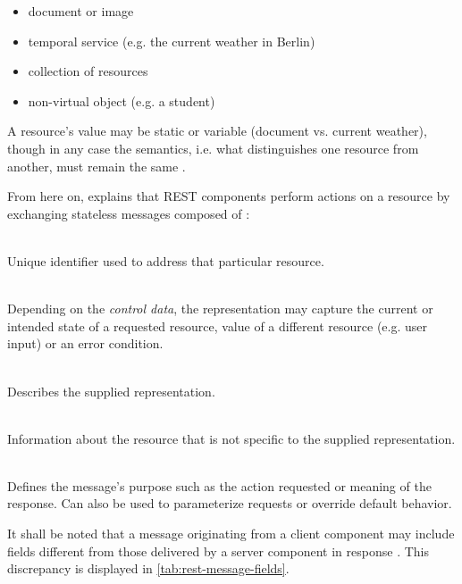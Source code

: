 \begin{appendices}
\begin{itemize}
  \item document or image
  \item temporal service (e.g. the current weather in Berlin)
  \item collection of resources
  \item non-virtual object (e.g. a student)
\end{itemize}

A resource's value may be static or variable (document vs. current weather), though in any case the semantics, i.e. what distinguishes one resource from another, must remain the same \cite[p.~89]{fielding2000architectural}.

From here on, \citeauthor{fielding2000architectural} explains that \ac{REST} components perform actions on a resource by exchanging stateless messages composed of \cite[pp.~90--91]{fielding2000architectural}:

\begin{description}[format={\storedescriptionlabel}]
	\item[Resource Identifier]
	\hfill \\
	Unique identifier used to address that particular resource.
	\item[Representation]
	\hfill \\
	Depending on the \textit{control data}, the representation may capture the current or intended state of a requested resource, value of a different resource (e.g. user input) or an error condition.
	\item[Representation Metadata]
	\hfill \\
	Describes the supplied representation.
	\item[Resource Metadata]
	\hfill \\
	Information about the resource that is not specific to the supplied representation.
	\item[Control Data]
	\hfill \\
	Defines the message's purpose such as the action requested or meaning of the response. Can also be used to parameterize requests or override default behavior.
\end{description}

It shall be noted that a message originating from a client component may include fields different from those delivered by a server component in response \cite[pp.~93--94]{fielding2000architectural}. This discrepancy is displayed in \autoref{tab:rest-message-fields}.


\end{appendices}

